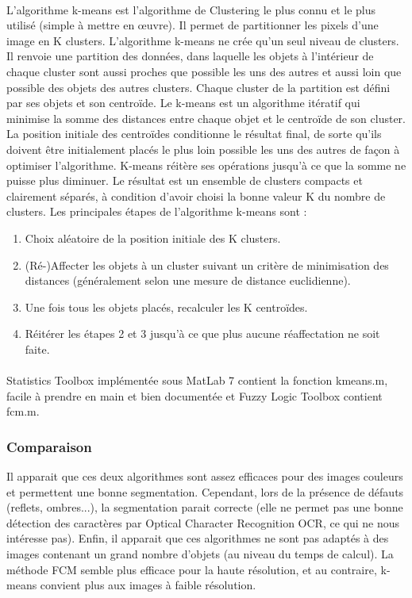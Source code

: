 \paragraph{}
L’algorithme k-means est l’algorithme de Clustering le plus connu et le plus utilisé (simple à mettre en œuvre). Il permet de partitionner les pixels d’une image en K clusters. L’algorithme k-means ne crée qu’un seul niveau de clusters. Il renvoie une partition des données, dans laquelle les objets à l’intérieur de chaque cluster sont aussi proches que possible les uns des autres et aussi loin que possible des objets des autres clusters. Chaque cluster de la partition est défini par ses objets et son centroïde. Le k-means est un algorithme itératif qui minimise la somme des distances entre chaque objet et le centroïde de son cluster. La position initiale des centroïdes conditionne le résultat final, de sorte qu'ils doivent être initialement placés le plus loin possible les uns des autres de façon à optimiser l’algorithme. K-means réitère ses opérations jusqu’à ce que la somme ne puisse plus diminuer. Le résultat est un ensemble de clusters compacts et clairement séparés, à condition d’avoir choisi la bonne valeur K du nombre de clusters. Les principales étapes de l’algorithme k-means sont :
\begin{enumerate}
\item Choix aléatoire de la position initiale des K clusters.
\item (Ré-)Affecter les objets à un cluster suivant un critère de minimisation des distances (généralement selon une mesure de distance euclidienne).
\item Une fois tous les objets placés, recalculer les K centroïdes.
\item Réitérer les étapes 2 et 3 jusqu’à ce que plus aucune réaffectation ne soit faite.
\end{enumerate}
\paragraph{}
Statistics Toolbox implémentée sous MatLab 7 contient la fonction kmeans.m, facile à prendre en main et bien documentée et Fuzzy Logic Toolbox contient fcm.m.

\subsubsection*{Comparaison}
Il apparait que ces deux algorithmes sont assez efficaces pour des images couleurs et permettent une bonne segmentation. Cependant, lors de la présence de défauts (reflets, ombres...), la segmentation parait correcte (elle ne permet pas une bonne détection des caractères par Optical Character Recognition OCR, ce qui ne nous intéresse pas). Enfin, il apparait que ces algorithmes ne sont pas adaptés à des images contenant un grand nombre d’objets (au niveau du temps de calcul). La méthode FCM semble plus efficace pour la haute résolution, et au contraire, k-means convient plus aux images à faible résolution.

